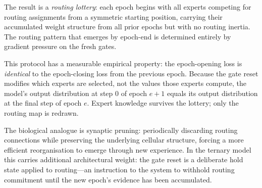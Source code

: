 \documentclass[11pt,a4paper]{article}
\begin{document}
The result is a \emph{routing lottery}: each epoch begins with all experts competing
for routing assignments from a symmetric starting position, carrying their accumulated
weight structure from all prior epochs but with no routing inertia. The routing
pattern that emerges by epoch-end is determined entirely by gradient pressure on
the fresh gates.

This protocol has a measurable empirical property: the epoch-opening loss is
\emph{identical} to the epoch-closing loss from the previous epoch. Because the
gate reset modifies which experts are selected, not the values those experts compute,
the model's output distribution at step 0 of epoch $e+1$ equals its output
distribution at the final step of epoch $e$. Expert knowledge survives the lottery;
only the routing map is redrawn.

The biological analogue is synaptic pruning: periodically discarding routing
connections while preserving the underlying cellular structure, forcing a more
efficient reorganisation to emerge through new experience. In the ternary model
this carries additional architectural weight: the gate reset is a deliberate hold
state applied to routing---an instruction to the system to withhold routing
commitment until the new epoch's evidence has been accumulated.
\end{document}
